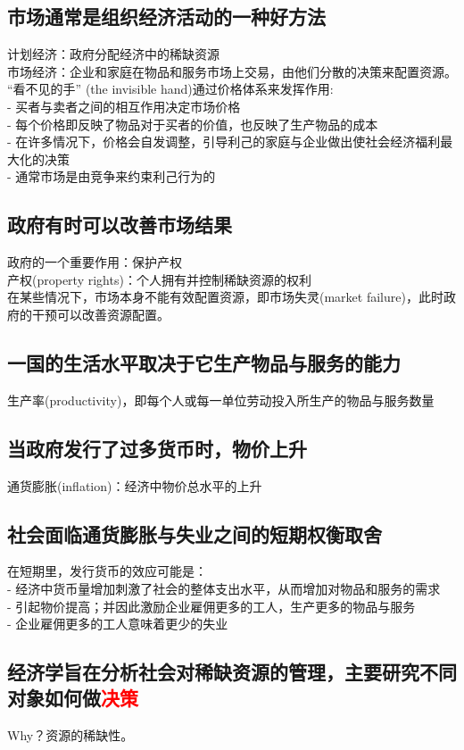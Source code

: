 \documentclass[12pt,a4paper]{article}
\begin{document}
\subsection{市场通常是组织经济活动的一种好方法}
\noindent 计划经济：政府分配经济中的稀缺资源\\
\noindent 市场经济：企业和家庭在物品和服务市场上交易，由他们分散的决策来配置资源。\\

“看不见的手” (the invisible hand)通过价格体系来发挥作用:
\\- 买者与卖者之间的相互作用决定市场价格
\\- 每个价格即反映了物品对于买者的价值，也反映了生产物品的成本
\\- 在许多情况下，价格会自发调整，引导利己的家庭与企业做出使社会经济福利最大化的决策
\\- 通常市场是由竞争来约束利己行为的
\subsection{政府有时可以改善市场结果}
\noindent 政府的一个重要作用：保护产权
\\产权(property rights)：个人拥有并控制稀缺资源的权利
\\在某些情况下，市场本身不能有效配置资源，即市场失灵(market failure)，此时政府的干预可以改善资源配置。
\subsection{一国的生活水平取决于它生产物品与服务的能力}
生产率(productivity)，即每个人或每一单位劳动投入所生产的物品与服务数量
\subsection{当政府发行了过多货币时，物价上升}
通货膨胀(inflation)：经济中物价总水平的上升
\subsection{社会面临通货膨胀与失业之间的短期权衡取舍}
\noindent 在短期里，发行货币的效应可能是：
\\- 经济中货币量增加刺激了社会的整体支出水平，从而增加对物品和服务的需求
\\- 引起物价提高；并因此激励企业雇佣更多的工人，生产更多的物品与服务
\\- 企业雇佣更多的工人意味着更少的失业


\subsection{经济学旨在分析社会对稀缺资源的管理，主要研究不同对象如何做\textcolor{red}{决策}
}
Why？资源的稀缺性。
\end{document}
